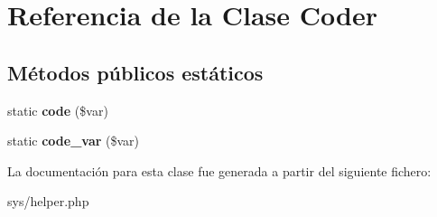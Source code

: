 \hypertarget{class_coder}{}\section{Referencia de la Clase Coder}
\label{class_coder}
\subsection*{Métodos públicos estáticos}
\begin{DoxyCompactItemize}
\item 
\hypertarget{class_coder_a4a5e2cad9dc8a17983aa33a2264c7100}{}static {\bfseries code} (\$var)\label{class_coder_a4a5e2cad9dc8a17983aa33a2264c7100}

\item 
\hypertarget{class_coder_abf0742d2b87e8df7f9408b9baca2c077}{}static {\bfseries code\+\_\+var} (\$var)\label{class_coder_abf0742d2b87e8df7f9408b9baca2c077}

\end{DoxyCompactItemize}


La documentación para esta clase fue generada a partir del siguiente fichero\+:\begin{DoxyCompactItemize}
\item 
sys/helper.\+php\end{DoxyCompactItemize}
